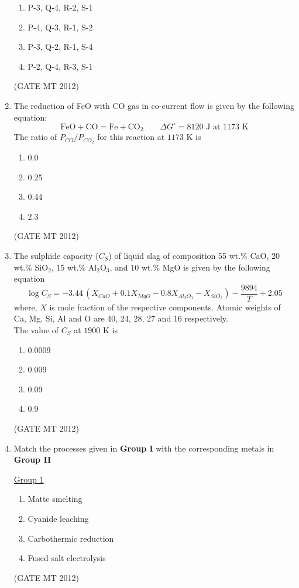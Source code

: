 \documentclass[journal, 11pt, onecolumn]{IEEEtran}
\theoremstyle{remark}
\begin{document}
\begin{enumerate}
\begin{multicols}{2}
\begin{enumerate}
\item P-3, Q-4, R-2, S-1
\item P-4, Q-3, R-1, S-2
\item P-3, Q-2, R-1, S-4
\item P-2, Q-4, R-3, S-1
\end{enumerate}
\end{multicols}
\hfill(GATE MT 2012)

\item The reduction of FeO with CO gas in co-current flow is given by the following equation: \\
\[
    \text{FeO} + \text{CO} = \text{Fe} + \text{CO}_2 \qquad \Delta G^\circ = 8120 \text{ J at 1173 K}
\]
The ratio of $P_{CO}/P_{CO_2}$ for this reaction at $1173$ K is

\begin{multicols}{2}
\begin{enumerate}  
\item 0.0
\item 0.25
\item 0.44
\item 2.3
\end{enumerate}
\end{multicols}
\hfill(GATE MT 2012)

\item The sulphide capacity ($C_S$) of liquid slag of composition 55 wt.\% CaO, 20 wt.\% SiO$_2$, 15 wt.\% Al$_2$O$_3$, and 10 wt.\% MgO is given by the following equation \\
\[
    \log C_S = -3.44 \, (X_{CaO} + 0.1 X_{MgO} - 0.8 X_{Al_2O_3} - X_{SiO_2}) - \frac{9894}{T} + 2.05
\]
where, $X$ is mole fraction of the respective components. Atomic weights of Ca, Mg, Si, Al and O are 40, 24, 28, 27 and 16 respectively. \\
The value of $C_S$ at $1900$ K is
\begin{multicols}{2}
\begin{enumerate}  
\item 0.0009
\item 0.009
\item 0.09
\item 0.9
\end{enumerate}
\end{multicols}
\hfill(GATE MT 2012)

\item Match the processes given in \textbf{Group I} with the corresponding metals in \textbf{Group II}
\begin{multicols}{2}
\underline{Group 1}
\begin{enumerate}[label=(\Alph*), start=16]
\item Matte smelting   
\item Cyanide leaching
\item Carbothermic reduction 
\item Fused salt electrolysis
\end{enumerate}
\hfill(GATE MT 2012)


\end{multicols}
\end{enumerate}
\end{document}
